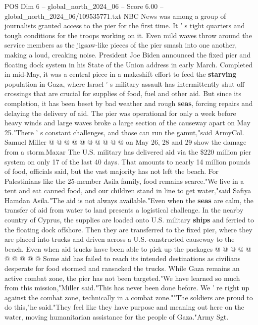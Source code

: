 \begin{textsample}{POS Dim 6 – global\_north\_2024\_06 – Score 6.00 – global\_north\_2024\_06/109535771.txt}  \label{ex:f6_pos_148}
NBC News was among a group of journalists granted access to the pier for the first time.
It ' s tight quarters and tough conditions for the troops working on it.
Even mild waves throw around the service members as the jigsaw-like pieces of the pier smash into one another, making a loud, creaking noise.
President Joe Biden announced the fixed pier and floating dock system in his State of the Union address in early March.
Completed in mid-May, it was a central piece in a makeshift effort to feed the \textbf{starving} population in Gaza, where Israel ' s military assault has intermittently shut off crossings that are crucial for supplies of food, fuel and other aid.
But since its completion, it has been beset by bad weather and rough \textbf{seas}, forcing repairs and delaying the delivery of aid.
The pier was operational for only a week before heavy winds and large waves broke a large section of the causeway apart on May 25."There ' s constant challenges, and those can run the gamut,"said ArmyCol.
Samuel Miller @ @ @ @ @ @ @ @ @ @ on May 26, 28 and 29 show the damage from a storm.Maxar The U.S. military has delivered aid via the \$220 million pier system on only 17 of the last 40 days.
That amounts to nearly 14 million pounds of food, officials said, but the vast majority has not left the beach.
For Palestinians like the 25-member Asila family, food remains scarce."We live in a tent and eat canned food, and our children stand in line to get water,"said Safiya Hamdan Asila."The aid is not always available."Even when the \textbf{seas} are calm, the transfer of aid from water to land presents a logistical challenge.
In the nearby country of Cyprus, the supplies are loaded onto U.S. military \textbf{ships} and ferried to the floating dock offshore.
Then they are transferred to the fixed pier, where they are placed into trucks and driven across a U.S.-constructed causeway to the beach.
Even when aid trucks have been able to pick up the packages @ @ @ @ @ @ @ @ @ @ Some aid has failed to reach its intended destinations as civilians desperate for food stormed and ransacked the trucks.
While Gaza remains an active combat zone, the pier has not been targeted."We have learned so much from this mission,"Miller said."This has never been done before.
We ' re right up against the combat zone, technically in a combat zone.""The soldiers are proud to do this,"he said."They feel like they have purpose and meaning out here on the water, moving humanitarian assistance for the people of Gaza."Army Sgt.

\end{textsample}
